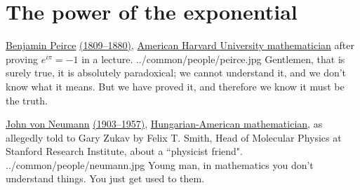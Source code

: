 \section{The power of the exponential}
\qboxnps
  { \href{http://www-history.mcs.st-andrews.ac.uk/Biographies/Peirce_Benjamin.html}{Benjamin Peirce} 
    \href{http://www-history.mcs.st-andrews.ac.uk/Timelines/TimelineF.html}{(1809--1880)}, 
    \href{http://www-history.mcs.st-andrews.ac.uk/BirthplaceMaps/Places/USA.html}{American Harvard University mathematician}
    after proving $e^{i\pi}=-1$ in a lecture.
    \footnotemark
  }
  {../common/people/peirce.jpg}
  {Gentlemen, that is surely true, it is absolutely paradoxical; 
   we cannot understand it, and we don't know what it means. 
   But we have proved it, and therefore we know it must be the truth.}
  
\qboxnps
  { \href{http://en.wikipedia.org/wiki/John_von_Neumann}{John von Neumann} 
    \href{http://www-history.mcs.st-andrews.ac.uk/Timelines/TimelineG.html}{(1903--1957)}, 
    \href{http://www-history.mcs.st-andrews.ac.uk/BirthplaceMaps/Places/Russia.html}{Hungarian-American mathematician},
    as allegedly told to Gary Zukav by Felix T. Smith, Head of Molecular Physics at Stanford Research Institute,
    about a ``physicist friend".
    \footnotemark
  }
  {../common/people/neumann.jpg}
  {Young man, in mathematics you don't understand things. You just get used to them.}
  


